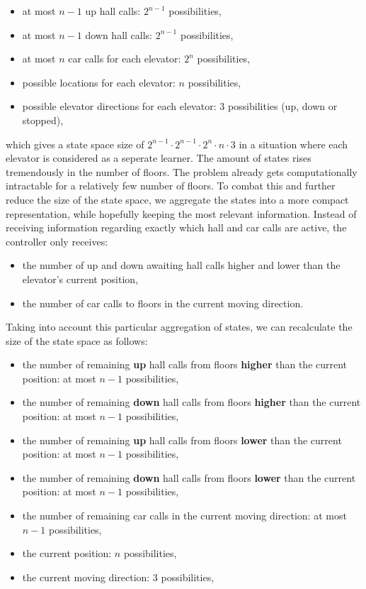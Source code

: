 \begin{itemize}
    \item at most $n - 1$ up hall calls: $2^{n-1}$ possibilities,
    \item at most $n - 1$ down hall calls: $2^{n-1}$ possibilities,
    \item at most $n$ car calls for each elevator: $2^{n}$ possibilities,
    \item possible locations for each elevator: $n$ possibilities,
    \item possible elevator directions for each elevator: $3$ possibilities (up, down or stopped),
\end{itemize}

which gives a state space size of $2^{n - 1} \cdot 2^{n - 1} \cdot 2^{n} \cdot n \cdot 3$ in a situation where each elevator is considered as a seperate learner. The amount of states rises tremendously in the number of floors. The problem already gets computationally intractable for a relatively few number of floors. To combat this and further reduce the size of the state space, we aggregate the states into a more compact representation, while hopefully keeping the most relevant information. Instead of receiving information regarding exactly which hall and car calls are active, the controller only receives: 

\begin{itemize}
    \item the number of up and down awaiting hall calls higher and lower than the elevator's current position,

    \item the number of car calls to floors in the current moving direction.
\end{itemize}

Taking into account this particular aggregation of states, we can recalculate the size of the state space as follows:

\begin{itemize}
    \item the number of remaining \textbf{up} hall calls from floors \textbf{higher} than the current position: at most $n - 1$ possibilities,
    \item the number of remaining \textbf{down} hall calls from floors \textbf{higher} than the current position: at most $n - 1$ possibilities,
    \item the number of remaining \textbf{up} hall calls from floors \textbf{lower} than the current position: at most $n - 1$ possibilities,
    \item the number of remaining \textbf{down} hall calls from floors \textbf{lower} than the current position: at most $n - 1$ possibilities,
    \item the number of remaining car calls in the current moving direction: at most $n - 1$ possibilities,
    \item the current position: $n$ possibilities,
    \item the current moving direction: 3 possibilities,
\end{itemize}

